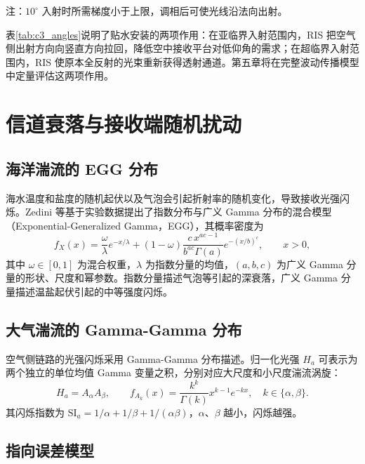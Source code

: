 注：$10^\circ$ 入射时所需梯度小于上限，调相后可使光线沿法向出射。

表\ref{tab:c3_angles}说明了贴水安装的两项作用：在亚临界入射范围内，RIS 把空气侧出射方向向竖直方向拉回，降低空中接收平台对低仰角的需求；在超临界入射范围内，RIS 使原本全反射的光束重新获得透射通道。第五章将在完整波动传播模型中定量评估这两项作用。

\section{信道衰落与接收端随机扰动}
\label{sec:c2_fading}

\subsection{海洋湍流的 EGG 分布}

海水温度和盐度的随机起伏以及气泡会引起折射率的随机变化，导致接收光强闪烁。Zedini 等基于实验数据提出了指数分布与广义 Gamma 分布的混合模型（Exponential-Generalized Gamma，EGG），其概率密度为
\begin{equation}
f_X(x)=\frac{\omega}{\lambda}e^{-x/\lambda}+(1-\omega)\frac{c\,x^{ac-1}}{b^{ac}\Gamma(a)}e^{-(x/b)^c},\qquad x>0,
\label{eq:c2_egg}
\end{equation}
其中 $\omega\in[0,1]$ 为混合权重，$\lambda$ 为指数分量的均值，$(a,b,c)$ 为广义 Gamma 分量的形状、尺度和幂参数。指数分量描述气泡等引起的深衰落，广义 Gamma 分量描述温盐起伏引起的中等强度闪烁。

\subsection{大气湍流的 Gamma-Gamma 分布}

空气侧链路的光强闪烁采用 Gamma-Gamma 分布描述。归一化光强 $H_a$ 可表示为两个独立的单位均值 Gamma 变量之积，分别对应大尺度和小尺度湍流涡旋：
\begin{equation}
H_a=A_\alpha A_\beta,\qquad
f_{A_k}(x)=\frac{k^k}{\Gamma(k)}x^{k-1}e^{-kx},\quad k\in\{\alpha,\beta\}.
\label{eq:c2_gg}
\end{equation}
其闪烁指数为 $\mathrm{SI}_a=1/\alpha+1/\beta+1/(\alpha\beta)$，$\alpha$、$\beta$ 越小，闪烁越强。

\subsection{指向误差模型}

